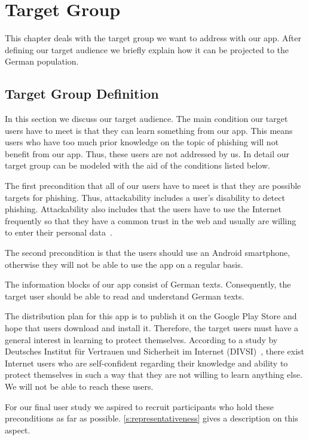 \section{Target Group}
\label{s:target_group}
This chapter deals with the target group we want to address with our app.
After defining our target audience we briefly explain how it can be projected to the German population.

\subsection{Target Group Definition}
\label{s:target_group_def}
In this section we discuss our target audience.
The main condition our target users have to meet is that they can learn something from our app.
This means users who have too much prior knowledge on the topic of phishing will not benefit from our app.
Thus, these users are not addressed by us.
In detail our target group can be modeled with the aid of the conditions listed below.
\begin{description}[leftmargin=0cm]
\item[Attackability:] The first precondition that all of our users have to meet is that they are possible targets for phishing.
Thus, attackability includes a user's disability to detect phishing.
Attackability also includes that the users have to use the Internet frequently so that they have a common trust in the web and usually are willing to enter their personal data~\cite{divsi2012divsi}.
\item[Android Users:] The second precondition is that the users should use an Android smartphone, otherwise they will not be able to use the app on a regular basis.
\item[Language:] The information blocks of our app consist of German texts.
Consequently, the target user should be able to read and understand German texts.
\item[Motivation:] The distribution plan for this app is to publish it on the Google Play Store and hope that users download and install it.
Therefore, the target users must have a general interest in learning to protect themselves.
 According to a study by Deutsches Institut f\"{u}r Vertrauen und Sicherheit im Internet (DIVSI)~\cite{divsi2012divsi}, there exist Internet users who are self-confident regarding their knowledge and ability to protect themselves in such a way that they are not willing to learn anything else.
We will not be able to reach these users.
\end{description}
For our final user study we aspired to recruit participants who hold these preconditions as far as possible.
\autoref{s:representativeness} gives a description on this aspect.

